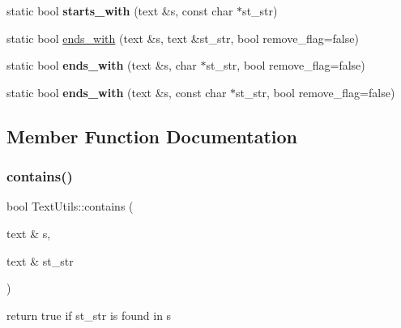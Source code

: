 \begin{DoxyCompactItemize}
static bool {\bfseries starts\+\_\+with} (text \&s, const char $\ast$st\+\_\+str)
\item 
static bool \hyperlink{classez_1_1essential_1_1TextUtils_a0018409b4f9f5999b572325558b5a4d2}{ends\+\_\+with} (text \&s, text \&st\+\_\+str, bool remove\+\_\+flag=false)
\item 
\mbox{\label{classez_1_1essential_1_1TextUtils_ae75b4e54b2047465d0495f2c1caaf6a3}} 
static bool {\bfseries ends\+\_\+with} (text \&s, char $\ast$st\+\_\+str, bool remove\+\_\+flag=false)
\item 
\mbox{\label{classez_1_1essential_1_1TextUtils_abe34b0721cba4423b665b65512ffd887}} 
static bool {\bfseries ends\+\_\+with} (text \&s, const char $\ast$st\+\_\+str, bool remove\+\_\+flag=false)
\end{DoxyCompactItemize}


\subsection{Member Function Documentation}
\mbox{\label{classez_1_1essential_1_1TextUtils_ad70575b0f44335fb0714513f5b730d82}} 
\subsubsection{\texorpdfstring{contains()}{contains()}}
{\footnotesize\ttfamily bool Text\+Utils\+::contains (\begin{DoxyParamCaption}\item[{text \&}]{s,  }\item[{text \&}]{st\+\_\+str }\end{DoxyParamCaption})\hspace{0.3cm}{\ttfamily [static]}}

return true if st\+\_\+str is found in s \mbox{\label{classez_1_1essential_1_1TextUtils_a0018409b4f9f5999b572325558b5a4d2}} 
